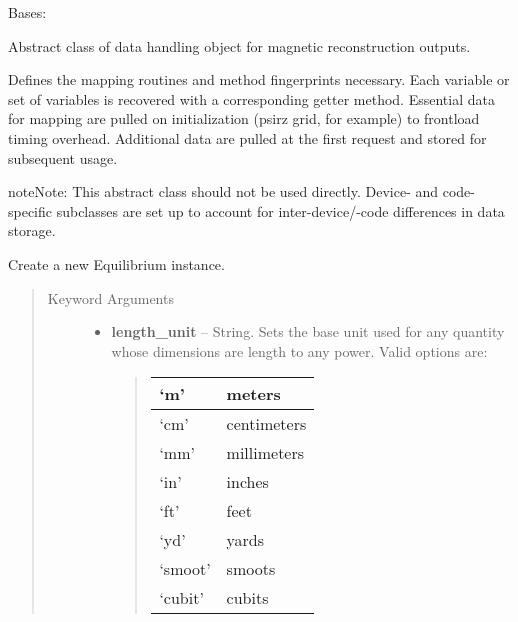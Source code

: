 \documentclass[letterpaper,10pt,english]{sphinxmanual}
\begin{document}
\begin{fulllineitems}
\label{eqtools:eqtools.core.Equilibrium}
Bases: 

Abstract class of data handling object for magnetic reconstruction outputs.

Defines the mapping routines and method fingerprints necessary.
Each variable or set of variables is recovered with a corresponding
getter method. Essential data for mapping are pulled on initialization
(psirz grid, for example) to frontload timing overhead. Additional data
are pulled at the first request and stored for subsequent usage.

\begin{notice}{note}{Note:}
This abstract class should not be used directly. Device- and code-
specific subclasses are set up to account for inter-device/-code differences
in data storage.
\end{notice}

Create a new Equilibrium instance.
\begin{quote}\begin{description}
\item[{Keyword Arguments}] \leavevmode\begin{itemize}
\item {} 
\textbf{length\_unit} --
String. Sets the base unit used for any quantity whose
dimensions are length to any power. Valid options are:
\begin{quote}

\begin{tabulary}{\linewidth}{|L|L|}
\hline

`m'
 & 
meters
\\\hline

`cm'
 & 
centimeters
\\\hline

`mm'
 & 
millimeters
\\\hline

`in'
 & 
inches
\\\hline

`ft'
 & 
feet
\\\hline

`yd'
 & 
yards
\\\hline

`smoot'
 & 
smoots
\\\hline

`cubit'
 & 
cubits
\\\hline


\end{tabulary}
\end{quote}
\end{itemize}
\end{description}
\end{quote}
\end{fulllineitems}
\end{document}
